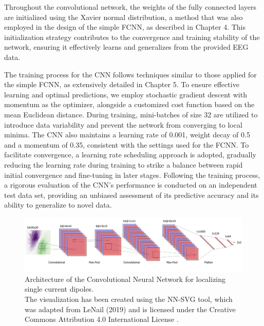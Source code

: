 \documentclass[a4paper, UKenglish, 11pt]{uiomaster}
\begin{document}
Throughout the convolutional network, the weights of the fully connected layers are initialized using the Xavier normal distribution, a method that was also employed in the design of the simple FCNN, as described in Chapter 4. This initialization strategy contributes to the convergence and training stability of the network, ensuring it effectively learns and generalizes from the provided EEG data.

The training process for the CNN follows techniques similar to those applied for the simple FCNN, as extensively detailed in Chapter 5. To ensure effective learning and optimal predictions, we employ stochastic gradient descent with momentum as the optimizer, alongside a customized cost function based on the mean Euclidean distance. During training, mini-batches of size 32 are utilized to introduce data variability and prevent the network from converging to local minima. The CNN also maintains a learning rate of 0.001, weight decay of 0.5 and a momentum of 0.35, consistent with the settings used for the FCNN. To facilitate convergence, a learning rate scheduling approach is adopted, gradually reducing the learning rate during training to strike a balance between rapid initial convergence and fine-tuning in later stages. Following the training process, a rigorous evaluation of the CNN's performance is conducted on an independent test data set, providing an unbiased assessment of its predictive accuracy and its ability to generalize to novel data.

\begin{figure}[!htb]
    \hspace*{-3cm} %
    \centering
    \includegraphics[scale=0.52]{figures/CNN.png}
    \caption{Architecture of the Convolutional Neural Network for localizing single current dipoles. \\
            The visualization has been created using the NN-SVG tool, which was adapted from LeNail (2019) and is licensed under the Creative Commons Attribution 4.0 International License \cite{lenail2019}.}
    \label{fig:architecture_CNN}
\end{figure}
\end{document}
